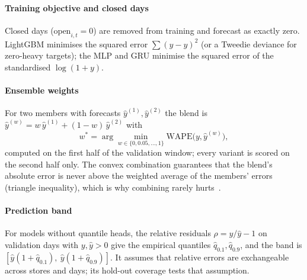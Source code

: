 \documentclass[conference]{IEEEtran}
\begin{document}
\paragraph*{Training objective and closed days} Closed days ($\text{open}_{i,t}=0$) are removed from
training and forecast as exactly zero. LightGBM minimises the squared error $\sum (y-\hat y)^2$ (or a
Tweedie deviance for zero-heavy targets); the MLP and GRU minimise the squared error of the
standardised $\log(1+y)$.

\paragraph*{Ensemble weights} For two members with forecasts $\hat y^{(1)},\hat y^{(2)}$ the blend
is $\hat y^{(w)} = w\,\hat y^{(1)} + (1-w)\,\hat y^{(2)}$ with
\begin{equation}
  w^\ast = \arg\min_{w\in\{0,0.05,\dots,1\}} \mathrm{WAPE}\bigl(y,\hat y^{(w)}\bigr),
\end{equation}
computed on the first half of the validation window; every variant is scored on the second half only. The convex combination guarantees that the
blend's absolute error is never above the weighted average of the members' errors (triangle
inequality), which is why combining rarely hurts~\cite{bates1969combination}.

\paragraph*{Prediction band} For models without quantile heads, the relative residuals
$\rho = y/\hat y - 1$ on validation days with $y,\hat y>0$ give the empirical quantiles
$\hat q_{0.1},\hat q_{0.9}$, and the band is $[\hat y(1+\hat q_{0.1}),\ \hat y(1+\hat q_{0.9})]$.
It assumes that relative errors are exchangeable across stores and days; its hold-out coverage tests
that assumption.
\end{document}
